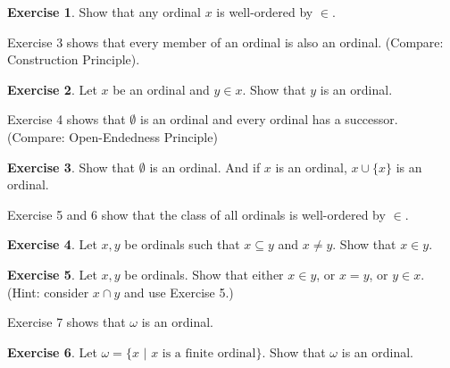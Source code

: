 \documentclass[11pt]{article}
\theoremstyle{definition}
\newtheorem{exer}{Exercise}
\begin{document}
\begin{exer}
Show that any ordinal $x$ is well-ordered by $\in$. 
\end{exer}

\noindent
Exercise 3 shows that every member of an ordinal is also an ordinal. (Compare: Construction Principle). 

\begin{exer}
Let $x$ be an ordinal and $y \in x$. Show that $y$ is an ordinal.
\end{exer}

\noindent
Exercise 4 shows that $\emptyset$ is an ordinal and every ordinal has a successor. (Compare: Open-Endedness Principle)

\begin{exer}
Show that $\emptyset$ is an ordinal. And if $x$ is an ordinal, $x \cup \{x\}$ is an ordinal.
\end{exer}

\noindent
Exercise 5 and 6 show that the class of all ordinals is well-ordered by $\in$. 

\begin{exer}
Let $x, y$ be ordinals such that $x \subseteq y$ and $x \neq y$. Show that $x \in y$.
\end{exer}

\begin{exer}
Let $x, y$ be ordinals. Show that either $x \in y$, or $x = y$, or $y \in x$. (Hint: consider $x \cap y$ and use Exercise 5.)

\end{exer}

\noindent
Exercise 7 shows that $\omega$ is an ordinal.

\begin{exer}
Let $\omega = \{ x \, \, | \, \, x \, \, \text{is a finite ordinal} \}$. Show that $\omega$ is an ordinal.
\end{exer}
\end{document}
